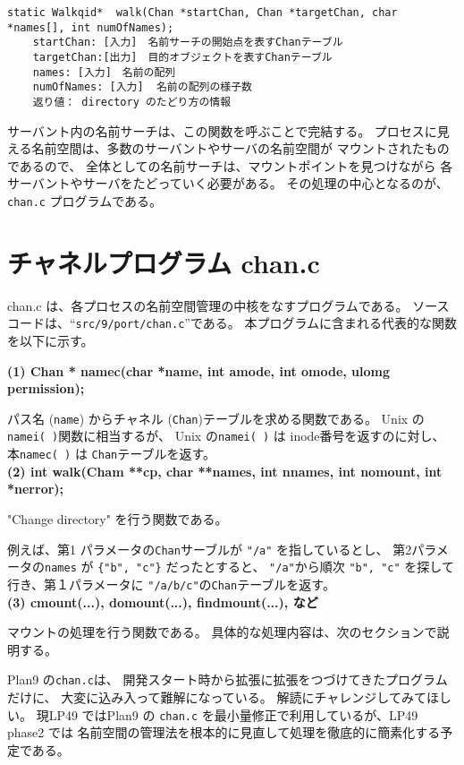 \begin{verbatim}
static Walkqid*  walk(Chan *startChan, Chan *targetChan, char *names[], int numOfNames);
    startChan: [入力]　名前サーチの開始点を表すChanテーブル
    targetChan:[出力]　目的オブジェクトを表すChanテーブル
    names: [入力]　名前の配列  
    numOfNames: [入力]  名前の配列の様子数
    返り値： directory のたどり方の情報
\end{verbatim}

サーバント内の名前サーチは、この関数を呼ぶことで完結する。
プロセスに見える名前空間は、多数のサーバントやサーバの名前空間が
マウントされたものであるので、
全体としての名前サーチは、マウントポイントを見つけながら
各サーバントやサーバをたどっていく必要がある。
その処理の中心となるのが、{\tt chan.c} プログラムである。


\section{チャネルプログラム chan.c}

   chan.c は、各プロセスの名前空間管理の中核をなすプログラムである。
   ソースコードは、``\verb|src/9/port/chan.c|''である。
   本プログラムに含まれる代表的な関数を以下に示す。

{\bf\flushleft  (1) Chan * namec(char *name, int amode, int omode, ulomg permission);}

        パス名 ({\tt name}) からチャネル ({\tt Chan})テーブルを求める関数である。
        Unix の {\tt namei( )}関数に相当するが、
        Unix の{\tt namei( )} は inode番号を返すのに対し、
        本{\tt namec( )} は {\tt Chan}テーブルを返す。
\\
    
{\bf\flushleft    (2) int walk(Cham **cp, char **names, int nnames, int nomount, int *nerror);}

        "Change directory" を行う関数である。

        例えば、第1 パラメータの{\tt Chan}サーブルが {\tt "/a"} を指しているとし、
        第2パラメータの{\tt names} が \verb|{"b", "c"}| だったとすると、
        {\tt "/a"}から順次 {\tt "b", "c"} を探して行き、第１パラメータに
        {\tt "/a/b/c"}の{\tt Chan}テーブルを返す。
        \\

     
{\bf\flushleft  (3) cmount(...), domount(...), findmount(...), など}

   マウントの処理を行う関数である。
具体的な処理内容は、次のセクションで説明する。

   Plan9 の{\tt chan.c}は、
開発スタート時から拡張に拡張をつづけてきたプログラムだけに、
大変に込み入って難解になっている。
解読にチャレンジしてみてほしい。
現LP49 ではPlan9 の {\tt chan.c} を最小量修正で利用しているが、LP49 phase2 では
名前空間の管理法を根本的に見直して処理を徹底的に簡素化する予定である。




